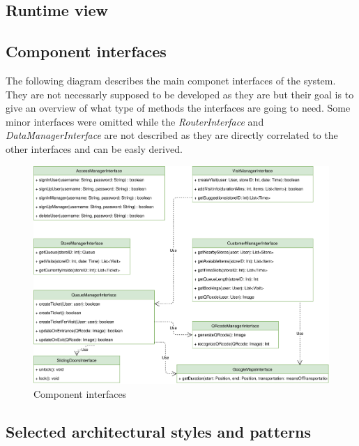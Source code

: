\documentclass[]{article}
\begin{document}
	\newpage
	
	
	
	
	
	\subsection{Runtime view}
	\subsection{Component interfaces}
	
	The following diagram describes the main componet interfaces of the system. \newline
	They are not necessarly supposed to be developed as they are but their goal is to give an overview of what type of methods the interfaces are going to need. \newline
	Some minor interfaces were omitted while the \textit{RouterInterface} and \textit{DataManagerInterface} are not described as they are directly correlated to the other interfaces and can be easly derived. \newline
	
		\begin{figure}[H]
			\centering
			\includegraphics[scale=0.7]{ComponentView/componentInterfaces.png}
			\caption{Component interfaces}
			\label{fig:componentInterfaces}
		\end{figure}
	
	
	\subsection{Selected architectural styles and patterns}
	
\end{document}
